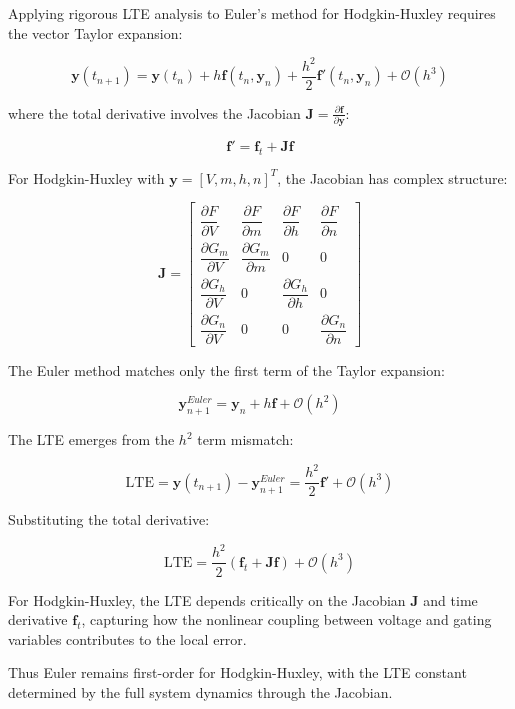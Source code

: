 Applying rigorous LTE analysis to Euler's method for Hodgkin-Huxley requires the vector Taylor expansion:

\[
\mathbf{y}(t_{n+1}) = \mathbf{y}(t_n) + h\mathbf{f}(t_n, \mathbf{y}_n) + \frac{h^2}{2}\mathbf{f}'(t_n, \mathbf{y}_n) + \mathcal{O}(h^3)
\]

where the total derivative involves the Jacobian $\mathbf{J} = \frac{\partial \mathbf{f}}{\partial \mathbf{y}}$:

\[
\mathbf{f}' = \mathbf{f}_t + \mathbf{J}\mathbf{f}
\]

For Hodgkin-Huxley with $\mathbf{y} = [V, m, h, n]^T$, the Jacobian has complex structure:

\[
\mathbf{J} = 
\left[\begin{array}{cccc}
\dfrac{\partial F}{\partial V} & \dfrac{\partial F}{\partial m} & \dfrac{\partial F}{\partial h} & \dfrac{\partial F}{\partial n} \\[2ex]
\dfrac{\partial G_m}{\partial V} & \dfrac{\partial G_m}{\partial m} & 0 & 0 \\[2ex]
\dfrac{\partial G_h}{\partial V} & 0 & \dfrac{\partial G_h}{\partial h} & 0 \\[2ex]
\dfrac{\partial G_n}{\partial V} & 0 & 0 & \dfrac{\partial G_n}{\partial n}
\end{array}\right]
\]

The Euler method matches only the first term of the Taylor expansion:

\[
\mathbf{y}_{n+1}^{Euler} = \mathbf{y}_n + h\mathbf{f} + \mathcal{O}(h^2)
\]

The LTE emerges from the $h^2$ term mismatch:

\[
\text{LTE} = \mathbf{y}(t_{n+1}) - \mathbf{y}_{n+1}^{Euler} = \frac{h^2}{2}\mathbf{f}' + \mathcal{O}(h^3)
\]

Substituting the total derivative:

\[
\text{LTE} = \frac{h^2}{2}(\mathbf{f}_t + \mathbf{J}\mathbf{f}) + \mathcal{O}(h^3)
\]

For Hodgkin-Huxley, the LTE depends critically on the Jacobian $\mathbf{J}$ and time derivative $\mathbf{f}_t$, capturing how the nonlinear coupling between voltage and gating variables contributes to the local error.

Thus Euler remains first-order for Hodgkin-Huxley, with the LTE constant determined by the full system dynamics through the Jacobian.